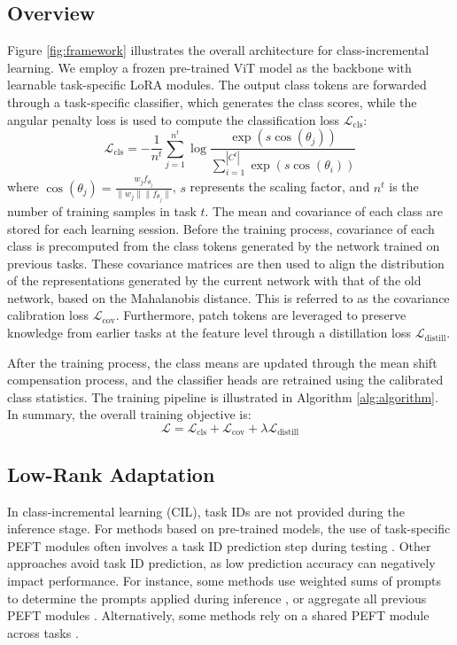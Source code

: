 \subsection{Overview}
Figure \ref{fig:framework} illustrates the overall architecture for class-incremental learning. We employ a frozen pre-trained ViT \cite{dosovitskiy2021an} model as the backbone with learnable task-specific LoRA modules. The output class tokens are forwarded through a task-specific classifier, which generates the class scores, while the angular penalty loss \cite{peng2022few,tan2024semantically} is used to compute the classification loss $\mathcal{L}_{\text{cls}}$:
\begin{equation}
    \mathcal{L}_{\text{cls}} = -\frac{1}{n^t} \sum_{j=1}^{n^t}\log \frac{\exp({s\cos(\theta_j)})}{\sum_{i=1}^{|C^t|} \exp({s\cos(\theta_i)})}
\end{equation}
where $\cos(\theta_j)=\frac{w_jf_{\theta_j}}{ \parallel w_j \parallel \parallel f_{\theta_j} \parallel}$, $s$ represents the scaling factor, and $n^t$ is the number of training samples in task $t$. The mean and
covariance of each class are stored for each learning session.
Before the training process, covariance of each class is precomputed from the class tokens generated by the network trained on previous tasks. These covariance matrices are then used to align the distribution of the representations generated by the current network with that of the old network, based on the Mahalanobis distance. This is referred to as the covariance calibration loss $\mathcal{L}_{\text{cov}}$. Furthermore, patch tokens are leveraged to preserve knowledge from earlier tasks at the feature level through a distillation loss $\mathcal{L}_{\text{distill}}$. 

After the training process, the class means are updated through the mean shift compensation process, and the classifier heads are retrained using the calibrated class statistics. The training pipeline is illustrated in Algorithm \ref{alg:algorithm}. In summary, the overall training objective is:
\begin{equation}
    \mathcal{L} = \mathcal{L}_{\text{cls}} + \mathcal{L}_{\text{cov}} + \lambda \mathcal{L}_{\text{distill}}
\end{equation}

\subsection{Low-Rank Adaptation}
In class-incremental learning (CIL), task IDs are not provided during the inference stage. For methods based on pre-trained models, the use of task-specific PEFT modules often involves a task ID prediction step during testing \cite{wang2022dualprompt,wang2024hierarchical,sun2024mos}. Other approaches avoid task ID prediction, as low prediction accuracy can negatively impact performance. For instance, some methods use weighted sums of prompts to determine the prompts applied during inference \cite{kurniawan2024evoprompt, smith2023coda}, or aggregate all previous PEFT modules \cite{zhou2024expandable, liang2024inflora}. Alternatively, some methods rely on a shared PEFT module across tasks \cite{huang2024ovor, tan2024semantically}.

